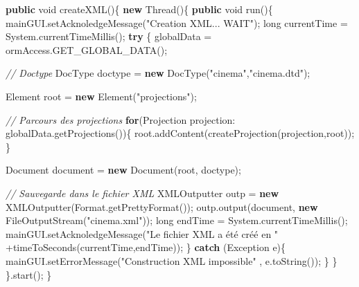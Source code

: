 \documentclass[]{article}
\newenvironment{Shaded}{}{}
\newcommand{\KeywordTok}[1]{\textcolor[rgb]{0.00,0.44,0.13}{\textbf{{#1}}}}
\newcommand{\DataTypeTok}[1]{\textcolor[rgb]{0.56,0.13,0.00}{{#1}}}
\newcommand{\StringTok}[1]{\textcolor[rgb]{0.25,0.44,0.63}{{#1}}}
\newcommand{\CommentTok}[1]{\textcolor[rgb]{0.38,0.63,0.69}{\textit{{#1}}}}
\newcommand{\FunctionTok}[1]{\textcolor[rgb]{0.02,0.16,0.49}{{#1}}}
\newcommand{\BuiltInTok}[1]{{#1}}
\newcommand{\NormalTok}[1]{{#1}}
\begin{document}
\begin{Shaded}
\begin{Highlighting}[]
	\KeywordTok{public} \DataTypeTok{void} \FunctionTok{createXML}\NormalTok{()\{}
	  \KeywordTok{new} \BuiltInTok{Thread}\NormalTok{()\{}
		  \KeywordTok{public} \DataTypeTok{void} \FunctionTok{run}\NormalTok{()\{}
			\NormalTok{mainGUI.}\FunctionTok{setAcknoledgeMessage}\NormalTok{(}\StringTok{"Creation XML... WAIT"}\NormalTok{);}
			\DataTypeTok{long} \NormalTok{currentTime = }\BuiltInTok{System}\NormalTok{.}\FunctionTok{currentTimeMillis}\NormalTok{();}
			\KeywordTok{try} \NormalTok{\{}
			  \NormalTok{globalData = ormAccess.}\FunctionTok{GET_GLOBAL_DATA}\NormalTok{();}
			
			  	  \CommentTok{// Doctype}
			  \NormalTok{DocType doctype = }\KeywordTok{new} \FunctionTok{DocType}\NormalTok{(}\StringTok{"cinema"}\NormalTok{,}\StringTok{"cinema.dtd"}\NormalTok{);}
			
			  \BuiltInTok{Element} \NormalTok{root = }\KeywordTok{new} \BuiltInTok{Element}\NormalTok{(}\StringTok{"projections"}\NormalTok{);}
			
			  \CommentTok{// Parcours des projections}
			  \KeywordTok{for}\NormalTok{(Projection projection: globalData.}\FunctionTok{getProjections}\NormalTok{())\{}
				\NormalTok{root.}\FunctionTok{addContent}\NormalTok{(}\FunctionTok{createProjection}\NormalTok{(projection,root));}
			  \NormalTok{\}}
			
			  \BuiltInTok{Document} \NormalTok{document = }\KeywordTok{new} \BuiltInTok{Document}\NormalTok{(root, doctype);}
			
			  \CommentTok{// Sauvegarde dans le fichier XML}
			  \NormalTok{XMLOutputter outp = }\KeywordTok{new} \FunctionTok{XMLOutputter}\NormalTok{(}\BuiltInTok{Format}\NormalTok{.}\FunctionTok{getPrettyFormat}\NormalTok{());}
			  \NormalTok{outp.}\FunctionTok{output}\NormalTok{(document, }\KeywordTok{new} \BuiltInTok{FileOutputStream}\NormalTok{(}\StringTok{"cinema.xml"}\NormalTok{));}
			  \DataTypeTok{long} \NormalTok{endTime = }\BuiltInTok{System}\NormalTok{.}\FunctionTok{currentTimeMillis}\NormalTok{();}
			  \NormalTok{mainGUI.}\FunctionTok{setAcknoledgeMessage}\NormalTok{(}\StringTok{"Le fichier XML a été créé en "}
			    \NormalTok{+}\FunctionTok{timeToSeconds}\NormalTok{(currentTime,endTime));}
			\NormalTok{\}}
			\KeywordTok{catch} \NormalTok{(}\BuiltInTok{Exception} \NormalTok{e)\{}
			  \NormalTok{mainGUI.}\FunctionTok{setErrorMessage}\NormalTok{(}\StringTok{"Construction XML impossible"}
			    \NormalTok{, e.}\FunctionTok{toString}\NormalTok{());}
			\NormalTok{\}}
		  \NormalTok{\}}
		\NormalTok{\}.}\FunctionTok{start}\NormalTok{();}
	\NormalTok{\}}


\end{Highlighting}
\end{Shaded}
\end{document}
